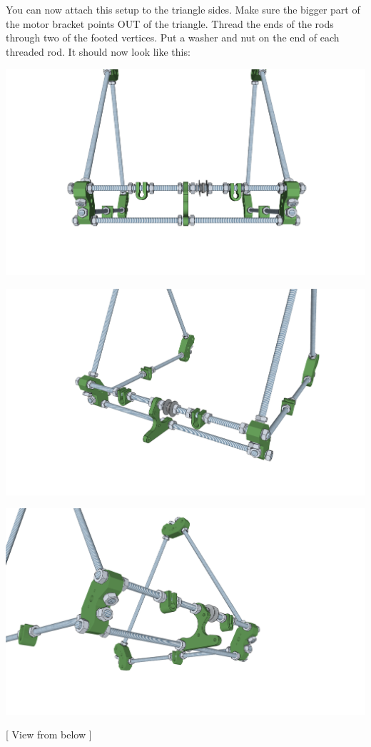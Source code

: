 \documentclass[twoside,openany,a4paper,titlepage]{memoir}
\begin{document}
	\section{}
	You can now attach this setup to the triangle sides. Make sure the bigger part of the motor bracket
	points OUT of the triangle. Thread the ends of the rods through two of the footed vertices. Put a washer
	and nut on the end of each threaded rod. It should now look like this:
	\begin{center}
		\includegraphics[width=1\linewidth]{graphics/ch2_7_1.png}
	\end{center}
	\begin{center}
		\includegraphics[width=1\linewidth]{graphics/ch2_7_2.png}
	\end{center}
	\begin{center}
		\includegraphics[width=1\linewidth]{graphics/ch2_7_3.png}
	\end{center}
	[ View from below ]
	
\end{document}
